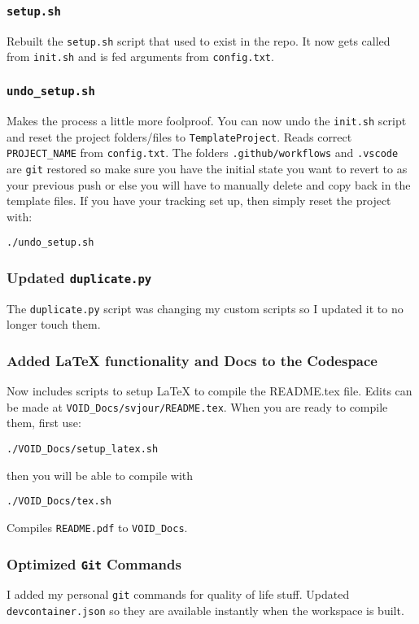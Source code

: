 \documentclass[twocolumn,natbib]{svjour3}        %
\begin{document}
\subsubsection{\texttt{setup.sh}} 
Rebuilt the \texttt{setup.sh} script that used to exist in the repo. It now gets called from \texttt{init.sh} and is fed arguments from \texttt{config.txt}.

\subsubsection{\protect\texttt{undo\_setup.sh}}
Makes the process a little more foolproof. You can now undo the \texttt{init.sh} script and reset the project folders/files to \texttt{TemplateProject}. Reads correct \texttt{PROJECT\_NAME} from \texttt{config.txt}. The folders \texttt{.github/workflows} and \texttt{.vscode} are \texttt{git} restored so make sure you have the initial state you want to revert to as your previous push or else you will have to manually delete and copy back in the template files. If you have your tracking set up, then simply reset the project with:
\begin{lstlisting}
./undo_setup.sh
\end{lstlisting}
\subsubsection{Updated \texttt{duplicate.py}}
The \texttt{duplicate.py} script was changing my custom scripts so I updated it to no longer touch them.

\subsubsection{Added LaTeX functionality and Docs to the Codespace}
Now includes scripts to setup LaTeX to compile the README.tex file. Edits can be made at \texttt{VOID\_Docs/svjour/README.tex}. When you are ready to compile them, first use:
\begin{lstlisting}
./VOID_Docs/setup_latex.sh
\end{lstlisting}
then you will be able to compile with
\begin{lstlisting}
./VOID_Docs/tex.sh
\end{lstlisting}
Compiles \texttt{README.pdf} to \texttt{VOID\_Docs}.
\subsubsection{Optimized \texttt{Git} Commands}
I added my personal \texttt{git} commands for quality of life stuff. Updated \texttt{devcontainer.json} so they are available instantly when the workspace is built.
\end{document}
